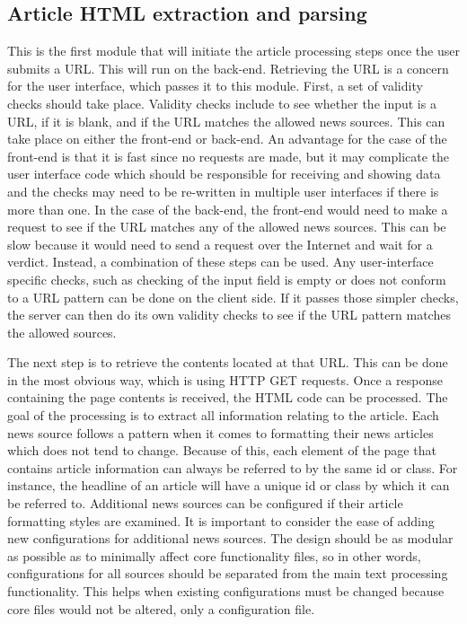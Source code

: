 \documentclass[11pt,titlepage]{report}
\begin{document}
\subsection{Article HTML extraction and parsing}
This is the first module that will initiate the article processing steps once the user submits a URL. This will run on the back-end. Retrieving the URL is a concern for the user interface, which passes it to this module. First, a set of validity checks should take place. Validity checks include to see whether the input is a URL, if it is blank, and if the URL matches the allowed news sources. This can take place on either the front-end or back-end. An advantage for the case of the front-end is that it is fast since no requests are made, but it may complicate the user interface code which should be responsible for receiving and showing data and the checks may need to be re-written in multiple user interfaces if there is more than one. In the case of the back-end, the front-end would need to make a request to see if the URL matches any of the allowed news sources. This can be slow because it would need to send a request over the Internet and wait for a verdict. Instead, a combination of these steps can be used. Any user-interface specific checks, such as checking of the input field is empty or does not conform to a URL pattern can be done on the client side. If it passes those simpler checks, the server can then do its own validity checks to see if the URL pattern matches the allowed sources.

The next step is to retrieve the contents located at that URL. This can be done in the most obvious way, which is using HTTP GET requests. Once a response containing the page contents is received, the HTML code can be processed. The goal of the processing is to extract all information relating to the article. Each news source follows a pattern when it comes to formatting their news articles which does not tend to change. Because of this, each element of the page that contains article information can always be referred to by the same id or class. For instance, the headline of an article will have a unique id or class by which it can be referred to. Additional news sources can be configured if their article formatting styles are examined. It is important to consider the ease of adding new configurations for additional news sources. The design should be as modular as possible as to minimally affect core functionality files, so in other words, configurations for all sources should be separated from the main text processing functionality. This helps when existing configurations must be changed because core files would not be altered, only a configuration file.
\end{document}

